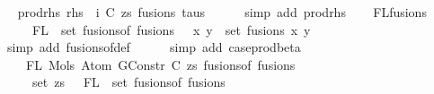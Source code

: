 \begin{isabellebody}
\ \isamarkupfalse%
\ prod{\isacharunderscore}{\kern0pt}rhs{}{\isacharcolon}{\kern0pt}\ {\isachardoublequoteopen}rhs\ {\isacharequal}{\kern0pt}\ {\isacharparenleft}{\kern0pt}i{\isacharcomma}{\kern0pt}\ {\isacharparenleft}{\kern0pt}C{\isacharcomma}{\kern0pt}\ zs{\isacharparenright}{\kern0pt}{\isacharcomma}{\kern0pt}\ fusions{\isacharcomma}{\kern0pt}\ taus{\isacharparenright}{\kern0pt}{\isachardoublequoteclose}\isanewline
\ \ \ \ \isamarkupfalse%
\ {\isacharparenleft}{\kern0pt}simp\ add{\isacharcolon}{\kern0pt}\ prod{\isacharunderscore}{\kern0pt}rhs{\isacharparenright}{\kern0pt}\isanewline
\isanewline
\isanewline
\ \ \isamarkupfalse%
\ FL{\isacharunderscore}{\kern0pt}fusions{\isacharcolon}{\kern0pt}\isanewline
\ \ \ \ {\isachardoublequoteopen}{\isasymUnion}\ {\isacharparenleft}{\kern0pt}FL\ {\isacharbackquote}{\kern0pt}\ set\ {\isacharparenleft}{\kern0pt}fusions{\isacharunderscore}{\kern0pt}of\ fusions{\isacharparenright}{\kern0pt}{\isacharparenright}{\kern0pt}\ {\isacharequal}{\kern0pt}\ {\isacharparenleft}{\kern0pt}{\isasymUnion}\ {\isacharparenleft}{\kern0pt}x{\isacharcomma}{\kern0pt}\ y{\isacharparenright}{\kern0pt}\ {\isasymin}\ set\ fusions{\isachardot}{\kern0pt}\ {\isacharbraceleft}{\kern0pt}x{\isacharcomma}{\kern0pt}\ y{\isacharbraceright}{\kern0pt}{\isacharparenright}{\kern0pt}{\isachardoublequoteclose}\isanewline
\ \ \ \ \isamarkupfalse%
\ {\isacharparenleft}{\kern0pt}simp\ add{\isacharcolon}{\kern0pt}\ fusions{\isacharunderscore}{\kern0pt}of{\isacharunderscore}{\kern0pt}def{\isacharparenright}{\kern0pt}\isanewline
\ \ \ \ \isamarkupfalse%
\ {\isacharparenleft}{\kern0pt}simp\ add{\isacharcolon}{\kern0pt}\ case{\isacharunderscore}{\kern0pt}prod{\isacharunderscore}{\kern0pt}beta{\isacharparenright}{\kern0pt}\isanewline
\isanewline
\ \ \isamarkupfalse%
\isanewline
\ \ \ \ {\isachardoublequoteopen}FL\ {\isacharparenleft}{\kern0pt}Mols{}\ {\isacharparenleft}{\kern0pt}Atom\ {\isacharparenleft}{\kern0pt}GConstr\ C{\isacharparenright}{\kern0pt}\ zs{\isacharparenright}{\kern0pt}\ {\isacharparenleft}{\kern0pt}fusions{\isacharunderscore}{\kern0pt}of\ fusions{\isacharparenright}{\kern0pt}{\isacharparenright}{\kern0pt}\ {\isacharequal}{\kern0pt}\isanewline
\ \ \ \ \ set\ zs\ {\isasymunion}\ {\isasymUnion}\ {\isacharparenleft}{\kern0pt}FL\ {\isacharbackquote}{\kern0pt}\ set\ {\isacharparenleft}{\kern0pt}fusions{\isacharunderscore}{\kern0pt}of\ fusions{\isacharparenright}{\kern0pt}{\isacharparenright}{\kern0pt}{\isachardoublequoteclose}\isanewline

\end{isabellebody}
